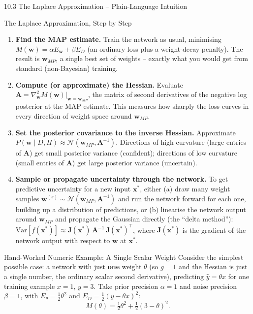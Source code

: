 \documentclass[aspectratio=169,10pt]{beamer}
\newcommand{\bw}{\mathbf{w}}
\newcommand{\bx}{\mathbf{x}}
\begin{document}
\begin{frame}[allowframebreaks]{10.3 The Laplace Approximation -- Plain-Language Intuition}
  \begin{block}{The Laplace Approximation, Step by Step}
    \begin{enumerate}
      \item \textbf{Find the MAP estimate.} Train the network as usual,
        minimising $M(\bw) = \alpha E_{\bw} + \beta E_D$ (an ordinary loss
        plus a weight-decay penalty). The result is $\bw_{MP}$, a single
        best set of weights -- exactly what you would get from standard
        (non-Bayesian) training.
      \item \textbf{Compute (or approximate) the Hessian.} Evaluate
        $\mathbf{A} = \nabla^2_{\bw} M(\bw)\big|_{\bw = \bw_{MP}}$, the
        matrix of second derivatives of the negative log posterior at the
        MAP estimate. This measures how sharply the loss curves in every
        direction of weight space around $\bw_{MP}$.
      \item \textbf{Set the posterior covariance to the inverse Hessian.}
        Approximate $P(\bw \mid D, H) \approx \mathcal{N}(\bw_{MP},
        \mathbf{A}^{-1})$. Directions of high curvature (large entries of
        $\mathbf{A}$) get small posterior variance (confident); directions
        of low curvature (small entries of $\mathbf{A}$) get large posterior
        variance (uncertain).
      \item \textbf{Sample or propagate uncertainty through the network.}
        To get predictive uncertainty for a new input $\bx^*$, either (a)
        draw many weight samples $\bw^{(s)} \sim \mathcal{N}(\bw_{MP},
        \mathbf{A}^{-1})$ and run the network forward for each one, building
        up a distribution of predictions, or (b) linearise the network
        output around $\bw_{MP}$ and propagate the Gaussian directly (the
        ``delta method''): $\mathrm{Var}[f(\bx^*)] \approx
        \mathbf{J}(\bx^*)\, \mathbf{A}^{-1}\, \mathbf{J}(\bx^*)^\top$, where
        $\mathbf{J}(\bx^*)$ is the gradient of the network output with
        respect to $\bw$ at $\bx^*$.
    \end{enumerate}
  \end{block}

  \framebreak

  \begin{exampleblock}{Hand-Worked Numeric Example: A Single Scalar Weight}
    Consider the simplest possible case: a network with just \textbf{one}
    weight $\theta$ (so $g=1$ and the Hessian is just a single number, the
    ordinary scalar second derivative), predicting $\hat{y} = \theta x$ for
    one training example $x=1$, $y=3$. Take prior precision $\alpha=1$ and
    noise precision $\beta=1$, with $E_{\theta} = \tfrac{1}{2}\theta^2$ and
    $E_D = \tfrac{1}{2}(y - \theta x)^2$:
    \[
      M(\theta) = \tfrac{1}{2}\theta^2 + \tfrac{1}{2}(3-\theta)^2.
    \]


\end{exampleblock}
\end{frame}
\end{document}

